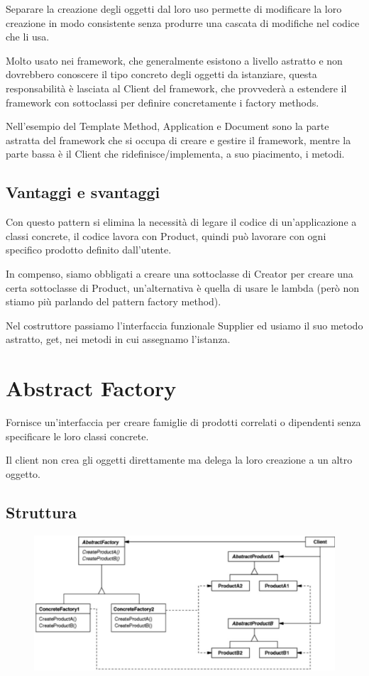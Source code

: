 Separare la creazione degli oggetti dal loro uso permette di modificare la loro creazione in modo consistente senza produrre una cascata di modifiche nel codice che 
li usa.

Molto usato nei framework, che generalmente esistono a livello astratto e non dovrebbero conoscere il tipo concreto degli oggetti da istanziare, questa responsabilità 
è lasciata al Client del framework, che provvederà a estendere il framework con sottoclassi per definire concretamente i factory methods.

Nell'esempio del Template Method, Application e Document sono la parte astratta del framework che si occupa di creare e gestire il framework, mentre la parte bassa 
è il Client che ridefinisce/implementa, a suo piacimento, i metodi.

\subsection{Vantaggi e svantaggi}

Con questo pattern si elimina la necessità di legare il codice di un’applicazione a classi concrete, il codice lavora con Product, quindi può lavorare con ogni specifico
prodotto definito dall’utente.

In compenso, siamo obbligati a creare una sottoclasse di Creator per creare una certa sottoclasse di Product, un'alternativa è quella di usare le lambda 
(però non stiamo più parlando del pattern factory method). 

Nel costruttore passiamo l'interfaccia funzionale Supplier ed usiamo il suo metodo astratto, get, nei metodi in cui assegnamo l'istanza.

\section{Abstract Factory}

Fornisce un’interfaccia per creare famiglie di prodotti correlati o dipendenti senza specificare le loro classi concrete.

Il client non crea gli oggetti direttamente ma delega la loro creazione a un altro oggetto.

\subsection{Struttura}

\begin{figure}[H]
    \centering
    \includegraphics[width=0.5\linewidth]{../../immagini/pattern_creazionale/struttura_abstract_factory}
\end{figure}

